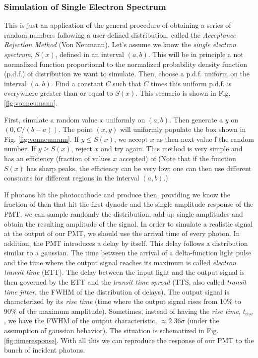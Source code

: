 \subsubsection{Simulation of Single Electron Spectrum}

This is just an application of the general procedure of obtaining a
series of random numbers following a user-defined distribution, called
the \emph{Acceptance-Rejection Method} (Von Neumann). Let's assume we
know the \emph{single electron spectrum}, $S(x)$, defined in an
interval $(a,b)$. This will be in principle a not normalized function
proportional to the normalized probability density function (p.d.f.)
of distribution we want to simulate. Then, choose a p.d.f. uniform on
the interval $(a,b)$. Find a constant $C$ such that $C$ times this
uniform p.d.f.  is everywhere greater than or equal to $S(x)$. This
scenario is shown in Fig. \ref{fig:vonneumann}.

\vonneumannfig

First, simulate a random value $x$ uniformly on $(a,b)$. Then generate
a $y$ on $(0,C/(b-a))$. The point $(x,y)$ will uniformly populate the
box shown in Fig. \ref{fig:vonneumann}. If $y\leq S(x)$, we accept $x$
as then next value f the random number. If $y\geq S(x)$, reject $x$
and try again.  This method is very simple and has an efficiency
(fraction of values $x$ accepted) of
%
\vonneumanneffeq
%
(Note that if the function $S(x)$ has sharp peaks, the efficiency can
be very low; one can then use different constants for different
regions in the interval $(a,b)$.)

\timeresponsefig

If \Nphot photons hit the photocathode and produce \Ntrial then,
providing we know the fraction of then that hit the first dynode and
the single \phe amplitude response of the PMT, we can sample randomly
the distribution, add-up single amplitudes and obtain the resulting
amplitude of the signal. In order to simulate a realistic signal at
the output of our PMT, we should use the arrival time of every photon.
In addition, the PMT introduces a delay by itself. This delay follows
a distribution similar to a gaussian. The time between the arrival of
a delta-function light pulse and the time where the output signal
reaches its maximum is called \emph{electron transit time} (ETT). The
delay between the input light and the output signal is then governed
by the ETT and the \emph{transit time spread} (TTS, also called
\emph{transit time jitter}, the FWHM of the distribution of delays).
The output signal is characterized by its \emph{rise time} (time where
the output signal rises from 10\% to 90\% of the maximum amplitude).
Sometimes, instead of having the \emph{rise time},
$t_{\mathrm{rise}}$, we have the FWHM of the output characteristic,
$\approx 2.36\sigma$ (under the assumption of gaussian behavior). The
situation is schematized in Fig.  \ref{fig:timeresponse}. With all
this we can reproduce the response of our PMT to the bunch of incident
photons.

